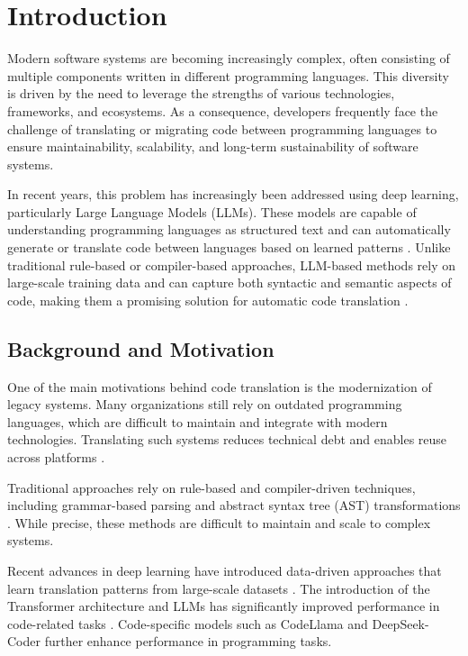 \chapter{Introduction}
\label{ch:intro}

Modern software systems are becoming increasingly complex, often consisting of
multiple components written in different programming languages. This diversity
is driven by the need to leverage the strengths of various technologies,
frameworks, and ecosystems. As a consequence, developers frequently face the
challenge of translating or migrating code between programming languages to
ensure maintainability, scalability, and long-term sustainability of software
systems.

In recent years, this problem has increasingly been addressed using deep
learning, particularly Large Language Models (LLMs). These models are capable
of understanding programming languages as structured text and can automatically
generate or translate code between languages based on learned patterns
\cite{llm_limitations}. Unlike traditional rule-based or compiler-based
approaches, LLM-based methods rely on large-scale training data and can capture
both syntactic and semantic aspects of code, making them a promising solution
for automatic code translation \cite{aljagthami2025prompt}.

\section{Background and Motivation}

One of the main motivations behind code translation is the modernization of
legacy systems. Many organizations still rely on outdated programming languages,
which are difficult to maintain and integrate with modern technologies.
Translating such systems reduces technical debt and enables reuse across
platforms \cite{yang2024llm, bruneel2025pipeline}.

Traditional approaches rely on rule-based and compiler-driven techniques, including grammar-based parsing
and abstract syntax tree (AST) transformations \cite{antlr, transpiler_survey,
traditional_translation_survey}. While precise, these methods are difficult to
maintain and scale to complex systems.

Recent advances in deep learning have introduced data-driven approaches that
learn translation patterns from large-scale datasets
\cite{code_translation_survey, llm_survey}. The introduction of the Transformer
architecture \cite{vaswani2017} and LLMs has significantly improved performance in code-related tasks
\cite{brown2020gpt3}. Code-specific models such as CodeLlama \cite{codellama} and
DeepSeek-Coder \cite{deepseek_coder} further enhance performance in programming tasks.

